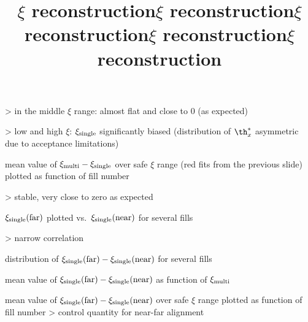 \centerline{}

\>> in the middle $\xi$ range: almost flat and close to 0 (as expected)

\>> low and high $\xi$: $\xi_{\rm single}$ significantly biased (distribution of $\th^*_x$ asymmetric due to acceptance limitations)



\newpage %
\title{$\xi$ reconstruction}

\> mean value of $\xi_{\rm multi} - \xi_{\rm single}$ over safe $\xi$ range (red fits from the previous slide) plotted as function of fill number

\centerline{}

\>> stable, very close to zero as expected

\newpage %
\title{$\xi$ reconstruction}

\> $\xi_{\rm single}(\hbox{far})$ plotted vs.~$\xi_{\rm single}(\hbox{near})$ for several fills

\centerline{}

\>> narrow correlation

\newpage %
\title{$\xi$ reconstruction}

\> distribution of $\xi_{\rm single}(\hbox{far}) - \xi_{\rm single}(\hbox{near})$ for several fills


\centerline{}

\newpage %
\title{$\xi$ reconstruction}

\> mean value of $\xi_{\rm single}(\hbox{far}) - \xi_{\rm single}(\hbox{near})$ as function of $\xi_{\rm multi}$

\centerline{}



\newpage %
\title{$\xi$ reconstruction}

\> mean value of $\xi_{\rm single}(\hbox{far}) - \xi_{\rm single}(\hbox{near})$ over safe $\xi$ range plotted as function of fill number
\>> control quantity for near-far alignment


